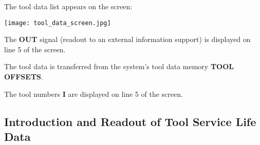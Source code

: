 The tool data list appears on the screen:

\begin{center}
    \texttt{[image: tool\_data\_screen.jpg]}
\end{center}

\begin{itemize}
\end{itemize}

\vspace{.5cm}

\begin{itemize}
\end{itemize}

\vspace{.5cm}

\begin{itemize}
\end{itemize}

The \textbf{OUT} signal (readout to an external information support) is displayed on line 5 of the screen.

The tool data is transferred from the system’s tool data memory \textbf{TOOL OFFSETS}.

The tool numbers \textbf{I} are displayed on line 5 of the screen.

\newpage

\subsection{Introduction and Readout of Tool Service Life Data}

\begin{itemize}
\end{itemize}

\vspace{.5cm}

\begin{itemize}
\end{itemize}

\vspace{.5cm}

\begin{itemize}
\end{itemize}

